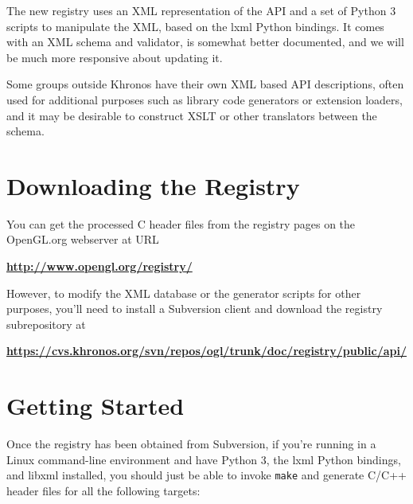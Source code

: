 \documentclass{article}
\def\code#1{{\tt #1}}
\begin{document}
The new registry uses an XML representation of the API and a set of
Python 3 scripts to manipulate the XML, based on the lxml Python
bindings. It comes with an XML schema and validator, is somewhat better
documented, and we will be much more responsive about updating it.

Some groups outside Khronos have their own XML based API descriptions,
often used for additional purposes such as library code generators or
extension loaders, and it may be desirable to construct XSLT or other
translators between the schema.


\section{Downloading the Registry}

You can get the processed C header files from the registry pages on the
OpenGL.org webserver at URL

\begin{center}
{\bf \href{http://www.opengl.org/registry/}
	  {http://www.opengl.org/registry/}}
\end{center}

However, to modify the XML database or the generator scripts for other
purposes, you'll need to install a Subversion client and download
the registry subrepository at

\begin{center}
\end{center}
\begin{center}
{\bf \href{https://cvs.khronos.org/svn/repos/ogl/trunk/doc/registry/public/api/}
	  {https://cvs.khronos.org/svn/repos/ogl/trunk/doc/registry/public/api/}}
\end{center}


\section{Getting Started}

Once the registry has been obtained from Subversion, if you're running
in a Linux command-line environment and have Python 3, the lxml Python
bindings, and libxml installed, you should just be able to invoke
\code{make} and generate C/C++ header files for all the following
targets:
\end{document}
